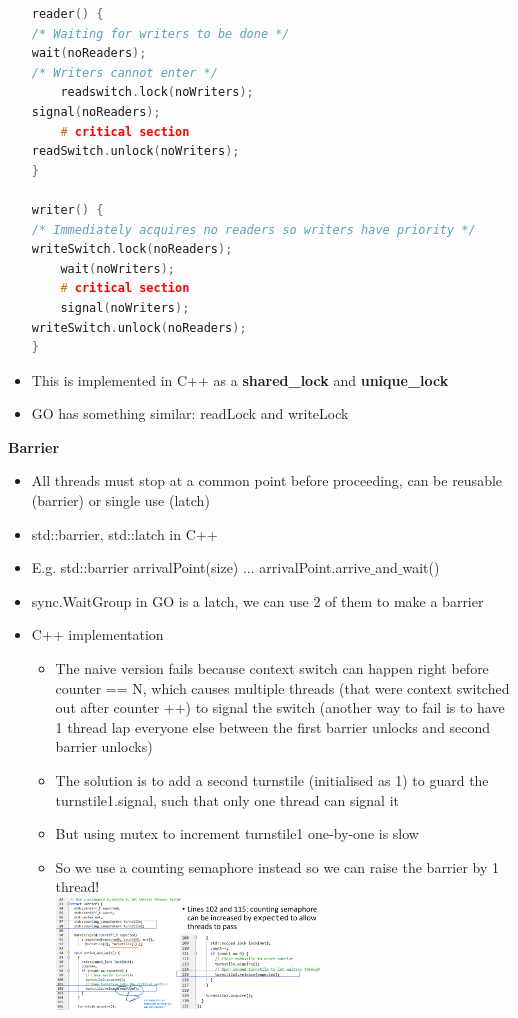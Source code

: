 \documentclass[10pt, landscape]{article}
\begin{document}
\begin{multicols}{4}
\begin{itemize}
\begin{lstlisting}[language=C++, breaklines=true, breakatwhitespace=true]
reader() {
/* Waiting for writers to be done */ 
wait(noReaders);
/* Writers cannot enter */
    readswitch.lock(noWriters);
signal(noReaders);
    # critical section
readSwitch.unlock(noWriters);
}

writer() {
/* Immediately acquires no readers so writers have priority */
writeSwitch.lock(noReaders);
    wait(noWriters);
    # critical section
    signal(noWriters);
writeSwitch.unlock(noReaders);
}
\end{lstlisting}
\item This is implemented in C++ as a \textbf{shared\_lock} and \textbf{unique\_lock}
\item GO has something similar: readLock and writeLock
\end{itemize}

\textbf{Barrier} \\
\begin{itemize}
    \item All threads must stop at a common point before proceeding, can be reusable (barrier) or single use (latch)
    \item std::barrier, std::latch in C++
    \item E.g. std::barrier arrivalPoint(size) ... arrivalPoint.arrive$\_$and$\_$wait()
    \item sync.WaitGroup in GO is a latch, we can use 2 of them to make a barrier
    \item C++ implementation
    \begin{itemize}
        \item The naive version fails because context switch can happen right before counter == N, which causes multiple threads (that were context switched out after counter ++) to signal the switch (another way to fail is to have 1 thread lap everyone else between the first barrier unlocks and second barrier unlocks)
        \item The solution is to add a second turnstile (initialised as 1) to guard the turnstile1.signal, such that only one thread can signal it
        \item But using mutex to increment turnstile1 one-by-one is slow 
        \item So we use a counting semaphore instead so we can raise the barrier by 1 thread!  \\ 
        \includegraphics*[width = 7cm, height = 3cm]{barrier.png}
    \end{itemize}
\end{itemize}


\end{multicols}
\end{document}
